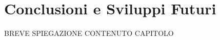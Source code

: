\chapter{Conclusioni e Sviluppi Futuri} %
%


\begin{citazione}
	BREVE SPIEGAZIONE CONTENUTO CAPITOLO
\end{citazione}

\newpage
